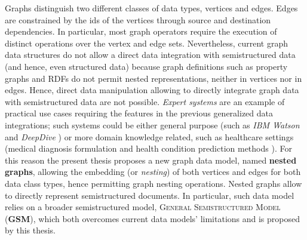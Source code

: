 Graphs distinguish two different classes of data types, vertices and edges. Edges are constrained by the ids of the vertices through source and destination dependencies. In particular, most graph operators require the execution of distinct operations over the vertex and edge sets. Nevertheless, current graph data structures do not allow a direct data integration with semistructured data  \cite{Pentaho,Parra} (and hence, even structured data) because graph definitions such as property graphs and RDFs do not permit nested representations, neither in vertices  nor in edges. Hence, direct data manipulation allowing to directly integrate graph data with semistructured data are not possible.  %
\textit{Expert systems} are an example of practical use cases requiring the features in the previous generalized data integrations; such systems could be either general purpose (such as \textit{IBM Watson} \cite{IBMWatson} and \textit{DeepDive} \cite{PalomaresAKR16}) or more domain knowledge related, such as healthcare settings (medical diagnosis formulation \cite{NestedGlaucoma} and health condition prediction methods \cite{OPLON15}). 
For this reason the present thesis proposes a new graph data model, named \textbf{nested graphs}, allowing the embedding (or \textit{nesting}) of both vertices and edges for both data class types, hence permitting graph nesting operations. Nested graphs allow to directly represent semistructured documents. In particular, such data model  relies on a broader semistructured model, \textsc{General Semistructured Model} (\textbf{GSM}), which both overcomes current  data models' limitations and is proposed by this thesis. 



